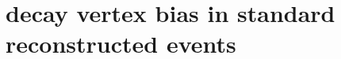 %



\section{\texorpdfstring{\lz}{Lambda} decay vertex bias in standard reconstructed events}
\label{sec:lambda_endvertex_bias}

